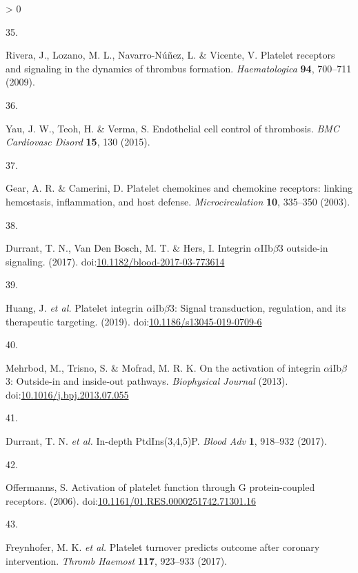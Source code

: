 \documentclass[11pt,twoside]{bristolthesis}
\newlength{\cslhangindent}
\newlength{\csllabelwidth}
\newenvironment{CSLReferences}[2] %
 {%
  \setlength{\parindent}{0pt}
  \ifodd #1 \everypar{\setlength{\hangindent}{\cslhangindent}}\ignorespaces\fi
  \ifnum #2 > 0
  \setlength{\parskip}{#2\baselineskip}
  \fi
 }%
 {}
\newcommand{\CSLLeftMargin}[1]{\parbox[t]{\csllabelwidth}{#1}}
\newcommand{\CSLRightInline}[1]{\parbox[t]{\linewidth - \csllabelwidth}{#1}\break}
\begin{document}
\begin{CSLReferences}{0}{0}
\leavevmode\hypertarget{ref-Rivera2009}{}%
\CSLLeftMargin{35. }
\CSLRightInline{Rivera, J., Lozano, M. L., Navarro-Núñez, L. \& Vicente, V. {Platelet receptors and signaling in the dynamics of thrombus formation}. \emph{Haematologica} \textbf{94}, 700--711 (2009).}

\leavevmode\hypertarget{ref-Yau2015}{}%
\CSLLeftMargin{36. }
\CSLRightInline{Yau, J. W., Teoh, H. \& Verma, S. {Endothelial cell control of thrombosis}. \emph{BMC Cardiovasc Disord} \textbf{15}, 130 (2015).}

\leavevmode\hypertarget{ref-Gear2003}{}%
\CSLLeftMargin{37. }
\CSLRightInline{Gear, A. R. \& Camerini, D. {Platelet chemokines and chemokine receptors: linking hemostasis, inflammation, and host defense}. \emph{Microcirculation} \textbf{10}, 335--350 (2003).}

\leavevmode\hypertarget{ref-Durrant2017a}{}%
\CSLLeftMargin{38. }
\CSLRightInline{Durrant, T. N., Van Den Bosch, M. T. \& Hers, I. {Integrin \(\alpha\)IIb\(\beta\)3 outside-in signaling}. (2017). doi:\href{https://doi.org/10.1182/blood-2017-03-773614}{10.1182/blood-2017-03-773614}}

\leavevmode\hypertarget{ref-Huang2019}{}%
\CSLLeftMargin{39. }
\CSLRightInline{Huang, J. \emph{et al.} {Platelet integrin \(\alpha\)iIb\(\beta\)3: Signal transduction, regulation, and its therapeutic targeting}. (2019). doi:\href{https://doi.org/10.1186/s13045-019-0709-6}{10.1186/s13045-019-0709-6}}

\leavevmode\hypertarget{ref-Mehrbod2013}{}%
\CSLLeftMargin{40. }
\CSLRightInline{Mehrbod, M., Trisno, S. \& Mofrad, M. R. K. {On the activation of integrin \(\alpha\)iIb\(\beta\)3: Outside-in and inside-out pathways}. \emph{Biophysical Journal} (2013). doi:\href{https://doi.org/10.1016/j.bpj.2013.07.055}{10.1016/j.bpj.2013.07.055}}

\leavevmode\hypertarget{ref-Durrant2017}{}%
\CSLLeftMargin{41. }
\CSLRightInline{Durrant, T. N. \emph{et al.} {In-depth PtdIns(3,4,5)P}. \emph{Blood Adv} \textbf{1}, 918--932 (2017).}

\leavevmode\hypertarget{ref-Offermanns2006}{}%
\CSLLeftMargin{42. }
\CSLRightInline{Offermanns, S. {Activation of platelet function through G protein-coupled receptors}. (2006). doi:\href{https://doi.org/10.1161/01.RES.0000251742.71301.16}{10.1161/01.RES.0000251742.71301.16}}

\leavevmode\hypertarget{ref-Freynhofer2017a}{}%
\CSLLeftMargin{43. }
\CSLRightInline{Freynhofer, M. K. \emph{et al.} {Platelet turnover predicts outcome after coronary intervention}. \emph{Thromb Haemost} \textbf{117}, 923--933 (2017).}


\end{CSLReferences}
\end{document}
